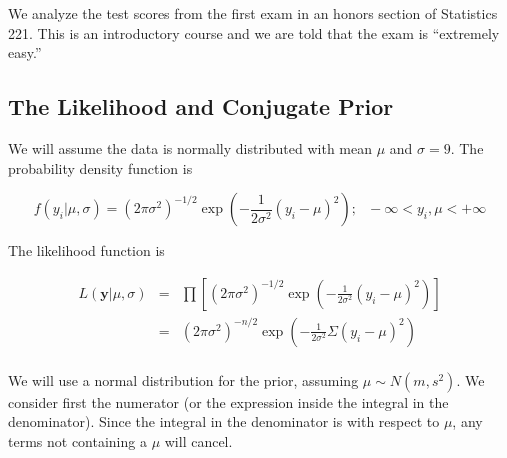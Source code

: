 \documentclass[12pt]{article}
\begin{document}
\noindent We analyze the test scores from the first exam in an honors section of Statistics 221.  This is an introductory course and we are told that the exam is ``extremely easy.''

\subsection{The Likelihood and Conjugate Prior}

\noindent We will assume the data is normally distributed with mean $\mu$ and $\sigma=9$.  The probability density function is

\[f(y_i|\mu,\sigma)=(2\pi\sigma^2)^{-1/2}\exp\left(-\frac{1}{2\sigma^2}(y_i-\mu)^2\right);\ \ \ -\infty<y_i,\mu<+\infty\]

\noindent The likelihood function is

\begin{eqnarray*}
L(\mathbf{y}|\mu,\sigma) &=& \prod\left[(2\pi\sigma^2)^{-1/2}\exp\left(-\frac{1}{2\sigma^2}(y_i-\mu)^2\right)\right] \\
&=& (2\pi\sigma^2)^{-n/2}\exp\left(-\frac{1}{2\sigma^2}\Sigma(y_i-\mu)^2\right) \\
\end{eqnarray*}

\noindent We will use a normal distribution for the prior, assuming $\mu\sim N(m,s^2)$. We consider first the numerator (or the expression inside the integral in the denominator). Since the integral in the denominator is with respect to $\mu$, any terms not containing a $\mu$ will cancel.
\end{document}
